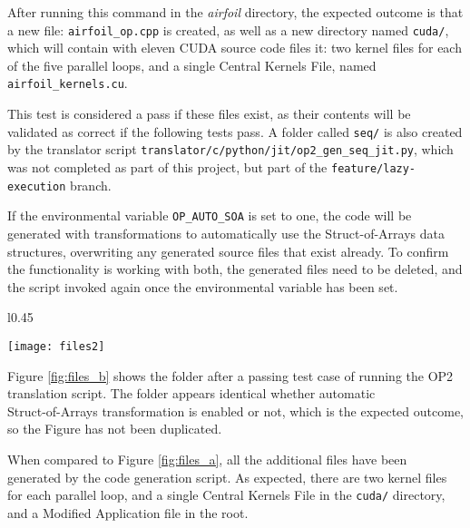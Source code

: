 \noindent After running this command in the \textit{airfoil} directory, the expected outcome is that a new file: \verb|airfoil_op.cpp| is created, as well as a new directory named \verb|cuda/|, which will contain with eleven CUDA source code files it: two kernel files for each of the five parallel loops, and a single Central Kernels File, named \verb|airfoil_kernels.cu|.
\par
This test is considered a pass if these files exist, as their contents will be validated as correct if the following tests pass. A folder called \verb|seq/| is also created by the translator script \verb|translator/c/python/jit/op2_gen_seq_jit.py|, which was not completed as part of this project, but part of the \verb|feature/lazy-execution| branch.
\par
If the environmental variable \verb|OP_AUTO_SOA| is set to one, the code will be generated with transformations to automatically use the Struct-of-Arrays data structures, overwriting any generated source files that exist already. To confirm the functionality is working with both, the generated files need to be deleted, and the script invoked again once the environmental variable has been set.

\begin{wrapfigure}[13]{l}{0.45\textwidth}
\caption{\textit{airfoil} folder after Code Generation}
\label{fig:files_b}
\texttt{[image: files2]}
\end{wrapfigure}
\par
Figure \ref{fig:files_b} shows the folder after a passing test case of running the OP2 translation script. The folder appears identical whether automatic\\ Struct-of-Arrays transformation is enabled or not, which is the expected outcome, so the Figure has not been duplicated.\par
When compared to Figure \ref{fig:files_a}, all the additional files have been generated by the code generation script. As expected, there are two kernel files for each parallel loop, and a single Central Kernels File in the \verb|cuda/| directory, and a Modified Application file in the root.
\par


